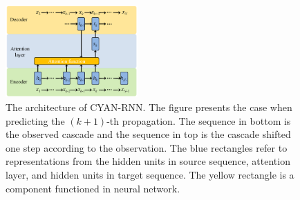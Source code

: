 \begin{figure}[t]
\centering
\includegraphics[width=0.45\textwidth]{figs/cyanrnn_framework.png}
\caption{The architecture of CYAN-RNN. The figure presents the case when
predicting the $(k+1)$-th propagation. The sequence in bottom is the observed
cascade and the sequence in top is the cascade shifted one step
according to the observation. The blue rectangles refer to representations from
the hidden units in source sequence, attention layer, and hidden units in
target sequence. The yellow rectangle is a component functioned in neural
network.}
\label{fig:cyrnn_frame}
\end{figure}

